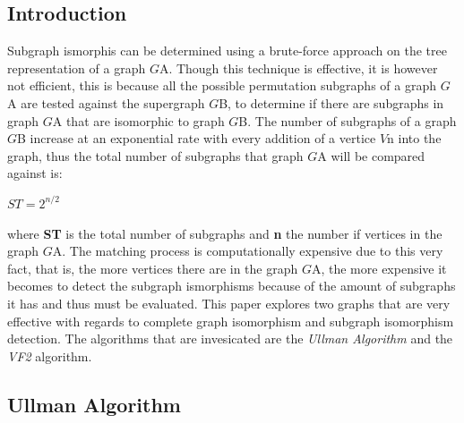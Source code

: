 \label{Search Matching Algorithm}


\subsection{Introduction}
Subgraph ismorphis can be determined using a brute-force approach on the tree representation of a graph $G${\tiny A}. Though this technique is effective,
it is however not efficient, this is because all the possible permutation subgraphs of a graph $G${\tiny A} are tested against the supergraph $G${\tiny B}, 
to determine if there are subgraphs in graph $G${\tiny A} that are isomorphic to graph $G${\tiny B}. The number of subgraphs of a graph $G${\tiny B} increase
at an exponential rate with every addition of a vertice $V${\tiny n} into the graph, thus the total number of subgraphs that graph $G${\tiny A} will be compared against is:
\begin{myEnumerate}
  \item $ST = 2^{n/2}$
\end{myEnumerate}
where \textbf{ST} is the total number of subgraphs and \textbf{n} the number if vertices in the graph $G${\tiny A}.\newline\newline
The matching process is computationally expensive due to this very fact, that is, the more vertices there are in the graph $G${\tiny A}, 
the more expensive it becomes to detect the subgraph ismorphisms because of the amount of subgraphs it has and thus must be evaluated.
\newline\newline This paper
explores two graphs that are very effective with regards to complete graph isomorphism and subgraph isomorphism detection. The algorithms that are invesicated 
are the \textit{Ullman Algorithm} and the \textit{VF2} algorithm. \newpage

\subsection{Ullman Algorithm}
\label{Ullman Algorithm}

